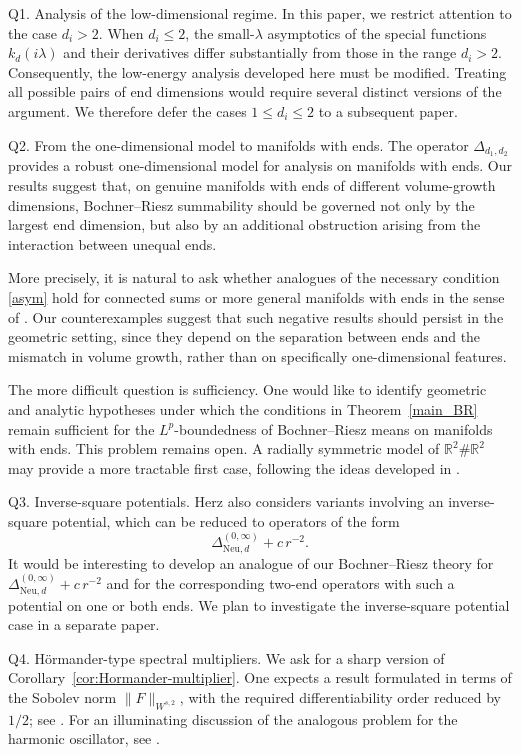 \documentclass[12pt]{amsart}
\begin{document}
{Q1. Analysis of the low-dimensional regime.}
In this paper, we restrict attention to the case \(d_i>2\). When \(d_i\leq 2\), the small-\(\lambda\) asymptotics of the special functions \(k_d(i\lambda)\) and their derivatives differ substantially from those in the range \(d_i>2\). Consequently, the low-energy analysis developed here must be modified. Treating all possible pairs of end dimensions would require several distinct versions of the argument. We therefore defer the cases \(1\leq d_i\leq 2\) to a subsequent paper.


{Q2. From the one-dimensional model to manifolds with ends.}
The operator \(\Delta_{d_1,d_2}\) provides a robust one-dimensional model for analysis on manifolds with ends. Our results suggest that, on genuine manifolds with ends of different volume-growth dimensions, Bochner--Riesz summability should be governed not only by the largest end dimension, but also by an additional obstruction arising from the interaction between unequal ends.

More precisely, it is natural to ask whether analogues of the necessary condition \eqref{asym} hold for connected sums or more general manifolds with ends in the sense of \cite{GS}. Our counterexamples suggest that such negative results should persist in the geometric setting, since they depend on the separation between ends and the mismatch in volume growth, rather than on specifically one-dimensional features.

The more difficult question is sufficiency. One would like to identify geometric and analytic hypotheses under which the conditions in Theorem~\ref{main_BR} remain sufficient for the \(L^p\)-boundedness of Bochner--Riesz means on manifolds with ends. This problem remains open. A radially symmetric model of \(\mathbb{R}^2\#\mathbb{R}^2\) may provide a more tractable first case, following the ideas developed in \cite{ST}.




{Q3.  Inverse-square potentials.}
Herz also considers variants involving an inverse-square potential, which can be reduced to operators of the form
\[
\Delta^{(0,\infty)}_{\mathrm{Neu},d} + c\,r^{-2}.
\]
It would be interesting to develop an analogue of our Bochner--Riesz theory for
$\Delta^{(0,\infty)}_{\mathrm{Neu},d} + c\,r^{-2}$ and for the corresponding two-end operators with such a potential on one or both ends. We plan to investigate the inverse-square potential case in a separate paper.


{Q4. H\"ormander-type spectral multipliers.}
We ask for a sharp version of Corollary~\ref{cor:Hormander-multiplier}. One expects a result formulated in terms of the Sobolev norm
\(\|F\|_{W^{s,2}}\), with the required differentiability order reduced by
\(1/2\); see \cite{CarberyGasperTrebels1984}. For an illuminating discussion
of the analogous problem for the harmonic oscillator, see \cite{Th89,PCWHAS}.
\end{document}

